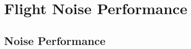 
%
%
\section{Flight Noise Performance}
\label{flight_noise_performance}
%

\subsection{Noise Performance}
\label{sec:noise_performance}


